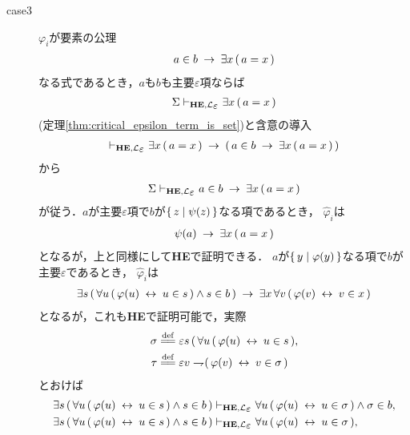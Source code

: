 \begin{metaprf}
\begin{description}
			\item[case3] $\varphi_{i}$が要素の公理
				\begin{align}
					a \in b \hspace{0.25em}\rightarrow\hspace{0.25em} \exists x\, (\, a = x\, )
				\end{align}
				なる式であるとき，$a$も$b$も主要$\varepsilon$項ならば
				\begin{align}
					\Sigma \provable{\mbox{{\bf HE}},\lang{\varepsilon}} \exists x\, (\, a = x\, )
				\end{align}
				(定理\ref{thm:critical_epsilon_term_is_set})と含意の導入
				\begin{align}
					\provable{\mbox{{\bf HE}},\lang{\varepsilon}} \exists x\, (\, a = x\, )
					\rarrow (\, a \in b \rarrow \exists x\, (\, a = x\, )\, )
				\end{align}
				から
				\begin{align}
					\Sigma \provable{\mbox{{\bf HE}},\lang{\varepsilon}} a \in b \rarrow \exists x\, (\, a = x\, )
				\end{align}
				が従う．$a$が主要$\varepsilon$項で$b$が$\{\, z \mid \psi(z)\, \}$なる項であるとき，
				$\hat{\varphi}_{i}$は
				\begin{align}
					\psi(a) \hspace{0.25em}\rightarrow\hspace{0.25em} \exists x\, (\, a = x\, )
				\end{align}
				となるが，上と同様にして{\bf HE}で証明できる．
				$a$が$\{\, y \mid \varphi(y)\, \}$なる項で$b$が主要$\varepsilon$であるとき，
				$\hat{\varphi}_{i}$は
				\begin{align}
					\exists s\, (\, \forall u\, (\, \varphi(u) \hspace{0.25em}\leftrightarrow\hspace{0.25em} u \in s\, )
					\wedge s \in b\, ) \hspace{0.25em}\rightarrow\hspace{0.25em} \exists x\, \forall v\, (\, \varphi(v) \hspace{0.25em}\leftrightarrow\hspace{0.25em} v \in x\, )
				\end{align}
				となるが，これも{\bf HE}で証明可能で，実際
				\begin{align}
					\sigma &\defeq \varepsilon s\, (\, \forall u\, (\, \varphi(u) \lrarrow u \in s\, ), \\
					\tau &\defeq \varepsilon v \negation (\, \varphi(v) \lrarrow v \in \sigma\, )
				\end{align}
				とおけば
				\begin{align}
					\exists s\, (\, \forall u\, (\, \varphi(u) \lrarrow u \in s\, )
					\wedge s \in b\, )
					&\provable{\mbox{{\bf HE}},\lang{\varepsilon}} 
					\forall u\, (\, \varphi(u) \lrarrow u \in \sigma\, )
					\wedge \sigma \in b, \\
					\exists s\, (\, \forall u\, (\, \varphi(u) \lrarrow u \in s\, )
					\wedge s \in b\, )
					&\provable{\mbox{{\bf HE}},\lang{\varepsilon}} 
					\forall u\, (\, \varphi(u) \lrarrow u \in \sigma\, ), \\

\end{align}
\end{description}
\end{metaprf}
